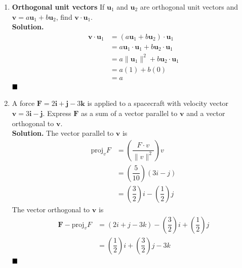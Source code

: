 \documentclass{report}
\begin{document}
\begin{enumerate}
          \newpage
          \setcounter{enumi}{28}
    \item \textbf{Orthogonal unit vectors} If $\mathbf{u}_1$ and $\mathbf{u}_2$ are orthogonal unit vectors and $\mathbf{v}=a \mathbf{u}_1+b \mathbf{u}_2$, find $\mathbf{v} \cdot \mathbf{u}_1$.
          \\\textbf{Solution.}
          \begin{align*}
              \mathbf{v} \cdot \mathbf{u}_1 & = (a \mathbf{u}_1+b \mathbf{u}_2) \cdot \mathbf{u}_1                  \\
                                            & = a \mathbf{u}_1 \cdot \mathbf{u}_1+b \mathbf{u}_2 \cdot \mathbf{u}_1 \\
                                            & = a \lVert \mathbf{u}_1 \rVert^2 + b \mathbf{u}_2 \cdot \mathbf{u}_1  \\
                                            & = a(1) + b(0)                                                         \\
                                            & = a
          \end{align*}
          $\hfill\blacksquare$

    \item A force $\mathbf{F}=2 \mathbf{i}+\mathbf{j}-3 \mathbf{k}$ is applied to a
          spacecraft with velocity vector $\mathbf{v}=3 \mathbf{i}-\mathbf{j}$. Express
          $\mathbf{F}$ as a sum of a vector parallel to $\mathbf{v}$ and a vector
          orthogonal to $\mathbf{v}$. \\\textbf{Solution. } The vector parallel to
          $\mathbf{v}$ is
          \begin{align*}
              \text{proj}_v F & = \left(\dfrac{F \cdot v}{\lVert v \rVert^2}\right)v      \\
                              & = \left(\dfrac{5}{10}\right)(3i - j)                      \\
                              & = \left(\dfrac{3}{2}\right)i - \left(\dfrac{1}{2}\right)j
          \end{align*}
          The vector orthogonal to $\mathbf{v}$ is
          \begin{align*}
              \mathbf{F} - \text{proj}_v F & = \left(2i + j - 3k\right) - \left(\dfrac{3}{2}\right)i + \left(\dfrac{1}{2}\right)j \\
                                           & = \left(\dfrac{1}{2}\right)i + \left(\dfrac{3}{2}\right)j - 3k
          \end{align*}
          $\hfill\blacksquare$

\end{enumerate}
\end{document}
